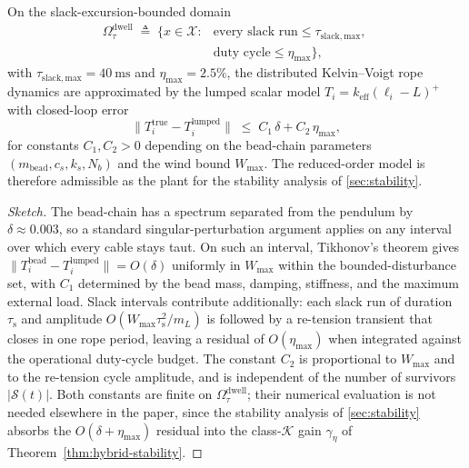 \begin{theorem}
\label{thm:reduction}
On the slack-excursion-bounded domain
\begin{align}
\label{eq:omega-dwell}
  \Omega_\tau^{\mathrm{dwell}} \;\triangleq\;
    \bigl\{ x \in \mathcal{X} :
      &\text{every slack run} \le \tau_{\mathrm{slack,max}},\;\\
      &\text{duty cycle} \le \eta_{\max} \bigr\},\nonumber
\end{align}
with $\tau_{\mathrm{slack,max}} = \SI{40}{\milli\second}$ and $\eta_{\max} = 2.5\%$, the distributed Kelvin--Voigt rope dynamics are approximated by the lumped scalar model $T_i = k_{\mathrm{eff}}(\ell_i - L)^+$ with closed-loop error
\begin{equation}
  \|T_i^{\mathrm{true}} - T_i^{\mathrm{lumped}}\|
    \;\le\; C_1\,\delta + C_2\,\eta_{\max},
  \label{eq:reduction-error}
\end{equation}
for constants $C_1, C_2 > 0$ depending on the bead-chain parameters $(m_{\mathrm{bead}}, c_s, k_s, N_b)$ and the wind bound $W_{\max}$. The reduced-order model is therefore admissible as the plant for the stability analysis of \cref{sec:stability}.
\end{theorem}

\begin{proof}[Sketch]
The bead-chain has a spectrum separated from the pendulum by $\delta \approx 0.003$, so a standard singular-perturbation argument applies on any interval over which every cable stays taut. On such an interval, Tikhonov's theorem gives $\|T_i^{\mathrm{bead}} - T_i^{\mathrm{lumped}}\| = O(\delta)$ uniformly in $W_{\max}$ within the bounded-disturbance set, with $C_1$ determined by the bead mass, damping, stiffness, and the maximum external load. Slack intervals contribute additionally: each slack run of duration $\tau_{\mathrm{s}}$ and amplitude $O(W_{\max}\tau_{\mathrm{s}}^2/m_L)$ is followed by a re-tension transient that closes in one rope period, leaving a residual of $O(\eta_{\max})$ when integrated against the operational duty-cycle budget. The constant $C_2$ is proportional to $W_{\max}$ and to the re-tension cycle amplitude, and is independent of the number of survivors $|\mathcal{S}(t)|$. Both constants are finite on $\Omega_\tau^{\mathrm{dwell}}$; their numerical evaluation is not needed elsewhere in the paper, since the stability analysis of \cref{sec:stability} absorbs the $O(\delta + \eta_{\max})$ residual into the class-$\mathcal{K}$ gain $\gamma_\eta$ of Theorem~\ref{thm:hybrid-stability}.
\end{proof}

